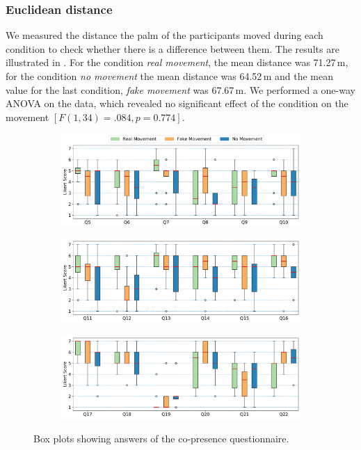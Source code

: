 \documentclass[english,runningheads,a4paper]{llncs}[2018/03/10]
\begin{document}
\subsubsection{Euclidean distance}
We measured the distance the palm of the participants moved during each condition to check whether there is a difference between them.
The results are illustrated in .
For the condition \textit{real movement}, the mean distance was 71.27\,m, for the condition \textit{no movement} the mean distance was 64.52\,m and the mean value for the last condition, \textit{fake movement} was 67.67\,m.
We performed a one-way ANOVA on the data, which revealed no significant effect of the condition on the movement $[F(1, 34) = .084, p = 0.774]$.
\begin{figure}[!h] 
    \centering
    \begin{subfigure}{\textwidth} \hfill
        \includegraphics[width=\textwidth]{figures/co-presenceAll0.pdf}
    \end{subfigure}
     \begin{subfigure}{\textwidth} \hfill
        \includegraphics[width=\textwidth]{figures/co-presenceAll1.pdf}
    \end{subfigure}
     \begin{subfigure}{\textwidth} \hfill
        \includegraphics[width=\textwidth]{figures/co-presenceAll2.pdf}
    \end{subfigure}
    \caption{Box plots showing answers of the co-presence questionnaire.}
    \label{fig:co-presence}
\end{figure}
\newpage
\end{document}
